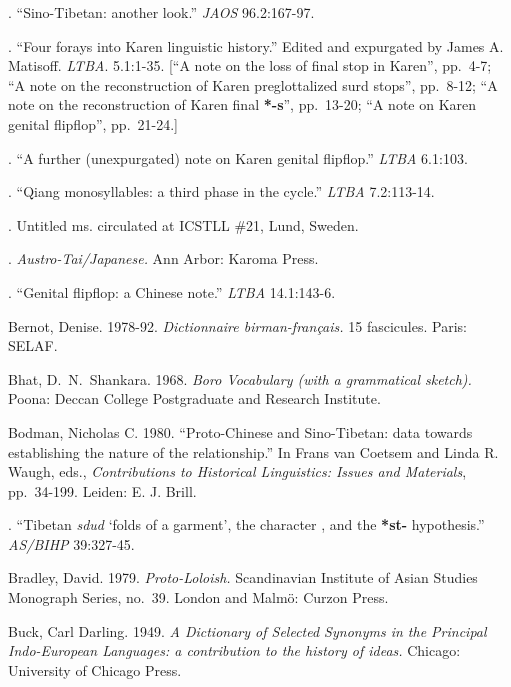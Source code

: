 .
“Sino-Tibetan: another look.”
\textit{JAOS} 96.2:167-97.

.
“Four forays into Karen linguistic history.”
Edited and expurgated by James A. Matisoff. \textit{LTBA}. 5.1:1-35. [“A note on the loss of final stop in Karen”, pp.\ 4-7; “A note on the reconstruction of Karen preglottalized surd stops”, pp.\ 8-12; “A note on the reconstruction of Karen final \textbf{*-s}”, pp.\ 13-20; “A note on Karen genital flipflop”, pp.\ 21-24.]

.
“A further (unexpurgated) note on Karen genital flipflop.”
\textit{LTBA} 6.1:103.

.
“Qiang monosyllables: a third phase in the cycle.”
\textit{LTBA} 7.2:113-14.

.
Untitled ms. circulated at ICSTLL \#21, Lund, Sweden.


.
\textit{Austro-Tai/Japanese.}
Ann Arbor: Karoma Press.

.
“Genital flipflop: a Chinese note.”
\textit{LTBA} 14.1:143-6.

Bernot, Denise.
1978-92.
\textit{Dictionnaire birman-français.}
15 fascicules. Paris: SELAF.

Bhat, D.~N.~Shankara.
1968.
\textit{Boro Vocabulary (with a grammatical sketch).}
Poona: Deccan College Postgraduate and Research Institute.

Bodman, Nicholas C.
1980.
“Proto-Chinese and Sino-Tibetan: data towards establishing the nature of the relationship.”
In Frans van Coetsem and Linda R. Waugh, eds., \textit{Contributions to Historical Linguistics: Issues and Materials}, pp.\ 34-199. Leiden: E. J. Brill.

.
“Tibetan \textit{sdud} ‘folds of a garment’, the character , and the \textbf{*st-} hypothesis.”
\textit{AS/BIHP} 39:327-45.

Bradley, David.
1979.
\textit{Proto-Loloish.}
Scandinavian Institute of Asian Studies Monograph Series, no.~39.  London and Malmö: Curzon Press.

Buck, Carl Darling.
1949.
\textit{A Dictionary of Selected Synonyms in the Principal Indo-European Languages: a contribution to the history of ideas.}
Chicago: University of Chicago Press.

